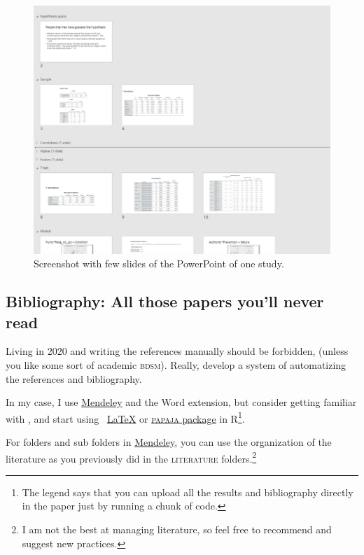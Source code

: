 \documentclass{article}
\begin{document}
\begin{center}
    \begin{figure}[]
        \centering
        \includegraphics[width=\textwidth]{images/ppt2.png}
        \caption{Screenshot with few slides of the PowerPoint of one study.}
        \label{fig:ppt2}
    \end{figure}
\end{center}

\subsection{Bibliography: All those papers you'll never read}
\label{subsec: bibliograph}
Living in 2020 and writing the references manually should be forbidden, (unless you like some sort of academic \textsc{bdsm}). Really, develop a system of automatizing the references and bibliography. 

In my case, I use \href{https://www.mendeley.com/?interaction_required=true}{Mendeley} and the Word extension, but consider getting familiar with \href{http://www.bibtex.org/}{}, and start using \ \href{https://www.latex-project.org/}{\LaTeX} or \href{https://crsh.github.io/papaja_man/}{\textsc{papaja} package} in R\footnote{The legend says that you can upload all the results and bibliography directly in the paper just by running a chunk of code.}.

For folders and sub folders in \href{https://www.mendeley.com/?interaction_required=true}{Mendeley}, you can use the organization of the literature as you previously did in the \textsc{literature} folders.\footnote{ I am not the best at managing literature, so feel free to recommend and suggest new practices. }
\end{document}
